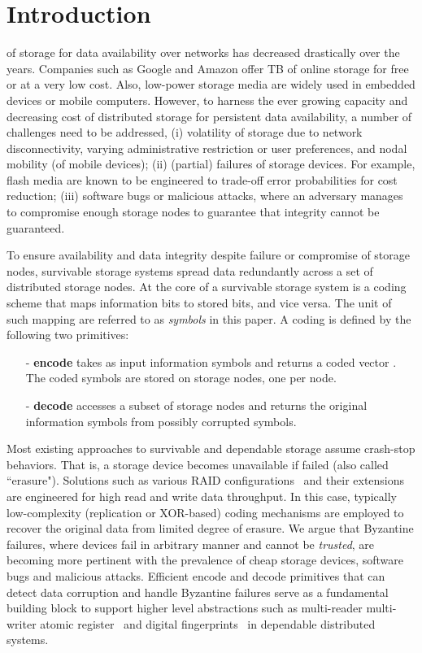 \documentclass[10pt,journal,letterpaper,compsoc]{IEEEtran}
\newcommand{\0}{{\bf 0}}
\begin{document}
\IEEEpeerreviewmaketitle


\section{Introduction}
\label{sect:intro}


 of storage for data availability over networks has decreased drastically over the years.  Companies such
as Google and Amazon offer TB of online storage for free or at a very low
cost.  Also, low-power storage media are widely used in embedded devices
or mobile computers. However, to harness the ever growing capacity and
decreasing cost of distributed storage for persistent data availability, a number of challenges need to be
addressed, (i) volatility of storage due to network
disconnectivity, varying administrative restriction or user preferences, and
nodal mobility (of mobile devices); (ii) (partial) failures of storage devices.
For example, flash media are known to be engineered to trade-off error
probabilities for cost reduction; (iii) software bugs or malicious attacks, where an
adversary manages to compromise enough storage nodes to guarantee that integrity cannot be guaranteed.

To ensure availability and data integrity despite failure or compromise of storage nodes,
survivable storage systems spread data redundantly across a set of distributed
storage nodes. At the core of a survivable storage system is a coding scheme
that maps information bits to stored bits, and vice versa. 
The unit of such mapping are referred to as \emph{symbols} in this paper. A  coding is
defined by the following two primitives:
\begin{itemize}
\item[-] {\bf encode}  takes as input 
 information symbols  and
returns a coded
vector .
The coded symbols are stored on storage nodes, one per node.
\item[-] {\bf decode}  accesses a
subset of storage nodes and returns the original  information symbols from possibly
corrupted symbols.
\end{itemize}

Most existing approaches to survivable and dependable storage assume crash-stop behaviors.
That is, a storage device becomes unavailable if failed (also called ``erasure").
Solutions such as various RAID configurations~\cite{raid} and their extensions
are engineered for high read and write data throughput. In this case, typically
low-complexity (replication or XOR-based) coding mechanisms are employed to
recover the original data from limited degree of erasure. We argue that Byzantine failures, where
devices fail in arbitrary manner and cannot be \emph{trusted}, are becoming more
pertinent with the prevalence of cheap storage devices, software bugs and
malicious attacks. Efficient encode and decode primitives that can detect data
corruption and handle Byzantine failures serve as a fundamental building block to
support higher level abstractions such as multi-reader multi-writer atomic
register~\cite{Goodson04} and digital fingerprints~\cite{Krawczyk93} in dependable distributed systems. 
\end{document}

